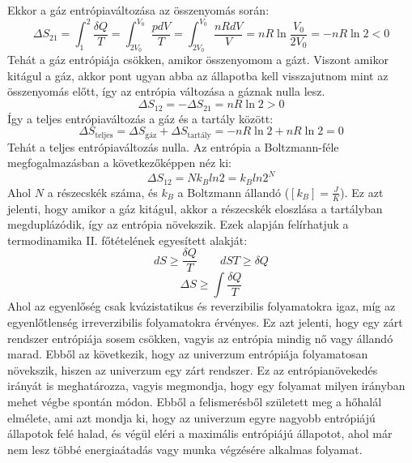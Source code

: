 \documentclass[a4paper,12pt]{article}
\begin{document}
Ekkor a gáz entrópiaváltozása az összenyomás során:
\begin{equation}
    \Delta S_{21} = \int_{1}^{2} \frac{\delta Q}{T} = \int_{2V_0}^{V_0} \frac{pdV}{T} = \int_{2V_0}^{V_0} \frac{nR dV}{V} = n R \ln{\frac{V_0}{2V_0}} = - n R \ln{2} < 0
\end{equation}
Tehát a gáz entrópiája csökken, amikor összenyomom a gázt. Viszont amikor kitágul a gáz, akkor pont ugyan abba az állapotba kell visszajutnom mint az összenyomás előtt, így az entrópia változása a gáznak nulla lesz.
\begin{equation}
    \Delta S_{12} = - \Delta S_{21} = n R \ln{2} > 0
\end{equation}
Így a teljes entrópiaváltozás a gáz és a tartály között:
\begin{equation}
    \Delta S_{\text{teljes}} = \Delta S_{\text{gáz}} + \Delta S_{\text{tartály}} = - n R \ln{2} + n R \ln{2} = 0
\end{equation}
Tehát a teljes entrópiaváltozás nulla. Az entrópia a Boltzmann-féle megfogalmazásban a következőképpen néz ki:
\begin{equation}
    \Delta S_{12} = N k_B ln2 = k_B ln2^{N} 
\end{equation}
Ahol $N$ a részecskék száma, és $k_B$ a Boltzmann állandó ($\left[k_B\right] = \frac{J}{K}$). Ez azt jelenti, hogy amikor a gáz kitágul, akkor a részecskék eloszlása a tartályban megduplázódik, így az entrópia növekszik.
\newline
\newline
Ezek alapján felírhatjuk a termodinamika II. főtételének egyesített alakját:
\begin{equation}
     dS \geq \frac{\delta Q}{T} \qquad dS T \geq \delta Q
\end{equation}
\begin{equation}
    \boxed{\Delta S \geq \int \frac{\delta Q}{T}}
\end{equation}
Ahol az egyenlőség csak kvázistatikus és reverzibilis folyamatokra igaz, míg az egyenlőtlenség irreverzibilis folyamatokra érvényes.
Ez azt jelenti, hogy egy zárt rendszer entrópiája sosem csökken, vagyis az entrópia mindig nő vagy állandó marad. Ebből az következik,
hogy az univerzum entrópiája folyamatosan növekszik, hiszen az univerzum egy zárt rendszer. Ez az entrópianövekedés irányát is meghatározza, vagyis megmondja, hogy egy folyamat milyen irányban mehet végbe spontán módon.
Ebből a felismerésből született meg a hőhalál elmélete, ami azt mondja ki, hogy az univerzum egyre nagyobb entrópiájú állapotok felé halad, és végül eléri a maximális entrópiájú állapotot, ahol már nem lesz többé energiaátadás vagy munka végzésére alkalmas folyamat.
\end{document}
